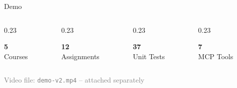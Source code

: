 \documentclass[10pt,aspectratio=169]{beamer}
\begin{document}
{\begin{frame}{Demo}
    \vspace{8pt}
    \begin{columns}[T]
        \begin{column}{0.23\textwidth}
            \begin{center}
                {\Huge \textcolor{accentblue}{\textbf{5}}} \\[2pt]
                \small Courses
            \end{center}
        \end{column}
        \begin{column}{0.23\textwidth}
            \begin{center}
                {\Huge \textcolor{accentgreen}{\textbf{12}}} \\[2pt]
                \small Assignments
            \end{center}
        \end{column}
        \begin{column}{0.23\textwidth}
            \begin{center}
                {\Huge \textcolor{accentorange}{\textbf{37}}} \\[2pt]
                \small Unit Tests
            \end{center}
        \end{column}
        \begin{column}{0.23\textwidth}
            \begin{center}
                {\Huge \textcolor{accentred}{\textbf{7}}} \\[2pt]
                \small MCP Tools
            \end{center}
        \end{column}
    \end{columns}

    \vspace{4pt}
    \begin{center}
        \footnotesize \textcolor{gray}{Video file: \texttt{demo-v2.mp4} -- attached separately}
    \end{center}
\end{frame}
}
\end{document}
